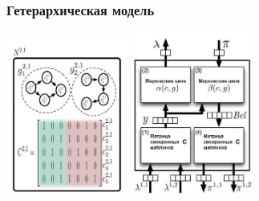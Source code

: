 \documentclass[default]{beamer}
\begin{document}
	\begin{frame}
		\frametitle{Гетерархическая модель}

		\begin{center}
			\includegraphics[width=0.3\textwidth]{mpf/hawkins_htm_ex_a}
			\includegraphics[width=0.3\textwidth]{mpf/hawkins_htm_ex_b}
		\end{center}
		\nocite{*}
		\printbibliography[keyword={hetermem}, resetnumbers=true]
	\end{frame}
		
\end{document}
